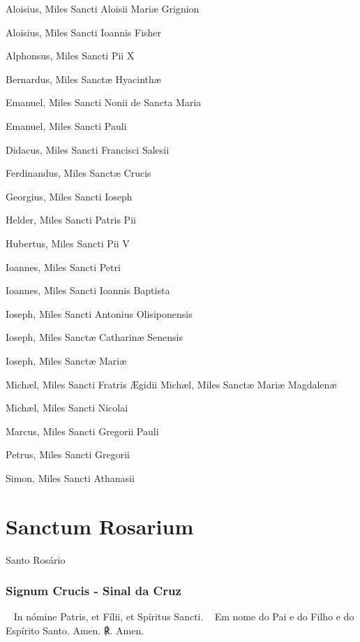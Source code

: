 \begin{paracol}{2}
\small{
Aloisius, Miles Sancti Aloisii Mariæ Grignion

Aloisius, Miles Sancti Ioannis Fisher

Alphonsus, Miles Sancti Pii X

Bernardus, Miles Sanctæ Hyacinthæ

Emanuel, Miles Sancti Nonii de Sancta Maria

Emanuel, Miles Sancti Pauli

Didacus, Miles Sancti Francisci Salesii

Ferdinandus, Miles Sanctæ Crucis

Georgius, Miles Sancti Ioseph

Helder, Miles Sancti Patris Pii

Hubertus, Miles Sancti Pii V

Ioannes, Miles Sancti Petri

Ioannes, Miles Sancti Ioannis Baptista

Ioseph, Miles Sancti Antonius Olisiponensis

Ioseph, Miles Sanctæ Catharinæ Senensis

Ioseph, Miles Sanctæ Mariæ

Michæl, Miles Sancti Fratris Ægidii
\switchcolumn
Michæl, Miles Sanctæ Mariæ Magdalenæ

Michæl, Miles Sancti Nicolai

Marcus, Miles Sancti Gregorii Pauli

Petrus, Miles Sancti Gregorii

Simon, Miles Sancti Athanasii
}
\end{paracol}

\newpage

\section{Sanctum Rosarium}

\begin{nscenter}Santo Rosário\end{nscenter}

\emph{}

\subsubsection{Signum Crucis - Sinal da Cruz}
\begin{paracol}{2}
{\redx ~} In nómine Patris, et Fílii, et Spíritus Sancti.
\switchcolumn
{\redx ~} Em nome do Pai e do Filho e do Espírito Santo.
 Amen.
\switchcolumn
{\redx ℟.} Amen.
\end{paracol}

